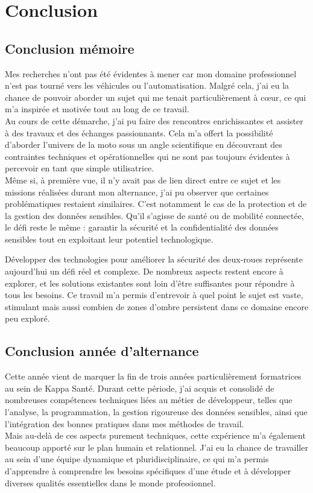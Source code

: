 \section{Conclusion}


\subsection{Conclusion mémoire}
Mes recherches n’ont pas été évidentes à mener car mon domaine professionnel  n’est pas tourné vers les véhicules ou l’automatisation. Malgré cela, j’ai eu la chance de pouvoir aborder un sujet qui me tenait particulièrement à cœur, ce qui m'a inspirée et motivée tout au long de ce travail.\\
Au cours de cette démarche, j’ai pu faire des rencontres enrichissantes et assister à des travaux et des échanges passionnants. Cela m’a offert la possibilité d’aborder l’univers de la moto sous un angle scientifique en découvrant des contraintes techniques et opérationnelles qui ne sont pas toujours évidentes à percevoir en tant que simple utilisatrice.\\
Même si, à première vue, il n’y avait pas de lien direct entre ce sujet et les missions réalisées durant mon alternance, j’ai pu observer que certaines problématiques restaient similaires. C’est notamment le cas de la protection et de la gestion des données sensibles. Qu’il s’agisse de santé ou de mobilité connectée, le défi reste le même : garantir la sécurité et la confidentialité des données sensibles tout en exploitant leur potentiel technologique.
\vspace{0.5cm}

Développer des technologies pour améliorer la sécurité des deux-roues représente aujourd’hui un défi réel et complexe. De nombreux aspects restent encore à explorer, et les solutions existantes sont loin d’être suffisantes pour répondre à tous les besoins. Ce travail m’a permis d'entrevoir à quel point le sujet est vaste, stimulant mais aussi combien de zones d’ombre persistent dans ce domaine encore peu exploré.


\subsection{Conclusion année d'alternance}
Cette année vient de marquer la fin de trois années particulièrement formatrices au sein de Kappa Santé. Durant cette période, j’ai acquis et consolidé de nombreuses compétences techniques liées au métier de développeur, telles que l’analyse, la programmation, la gestion rigoureuse des données sensibles, ainsi que l’intégration des bonnes pratiques dans mes méthodes de travail.\\
Mais au-delà de ces aspects purement techniques, cette expérience m'a également beaucoup apporté sur le plan humain et relationnel. J'ai eu la chance de travailler au sein d'une équipe dynamique et pluridisciplinaire, ce qui m’a permis d’apprendre à comprendre les besoins spécifiques d'une étude et à développer diverses qualités essentielles dans le monde professionnel.
\vspace{0.5cm}

